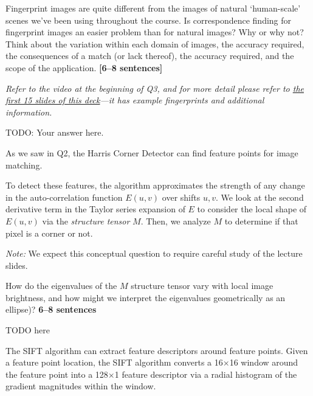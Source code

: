 \documentclass{csci1430}
\begin{document}
\begin{orangebox}
Fingerprint images are quite different from the images of natural `human-scale' scenes we've been using throughout the course. Is correspondence finding for fingerprint images an easier problem than for natural images? Why or why not? Think about the variation within each domain of images, the accuracy required, the consequences of a match (or lack thereof), the accuracy required, and the scope of the application. \textbf{[6--8 sentences]}

\emph{Refer to the video at the beginning of Q3, and for more detail please refer to \href{http://biometrics.cse.msu.edu/Presentations/AnilJain_UniquenessOfFingerprints_NAS05.pdf}{the first 15 slides of this deck}---it has example fingerprints and additional information.}
\end{orangebox}

\begin{answer}[height=16]
TODO: Your answer here.
\end{answer}


\pagebreak


\begin{question}[points=3,drawbox=false]
As we saw in Q2, the Harris Corner Detector can find feature points for image matching.

To detect these features, the algorithm approximates the strength of any change in the auto-correlation function $E(u, v)$ over shifts $u,v$. We look at the second derivative term in the Taylor series expansion of $E$ to consider the local shape of $E(u, v)$ via the \emph{structure tensor} $M$. Then, we analyze $M$ to determine if that pixel is a corner or not.

\textit{Note:} We expect this conceptual question to require careful study of the lecture slides.
\end{question}

\begin{orangebox}
How do the eigenvalues of the $M$ structure tensor vary with local image brightness, and how might we interpret the eigenvalues geometrically as an ellipse)? \textbf{6--8 sentences}
\end{orangebox}

\begin{answer}[height=16]
TODO here
\end{answer}

\pagebreak

\begin{question}[points=5,drawbox=false]
The SIFT algorithm can extract feature descriptors around feature points. Given a feature point location, the SIFT algorithm converts a 16$\times$16 window around the feature point into a 128$\times$1 feature descriptor via a radial histogram of the gradient magnitudes within the window.
\end{question}
\end{document}
